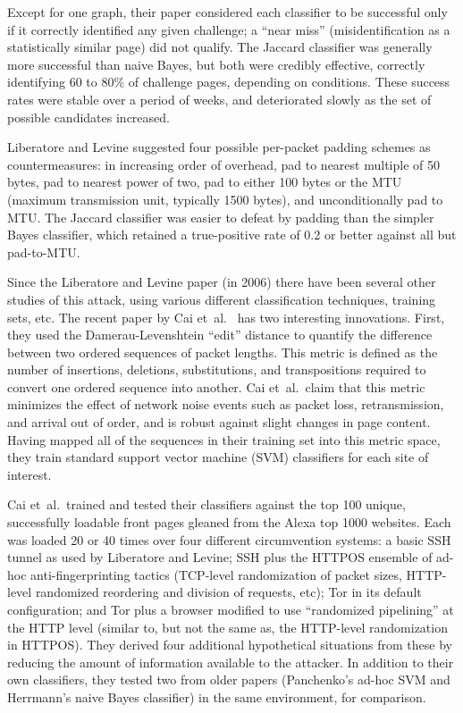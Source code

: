 \documentclass{cmuecequal}
\begin{document}
Except for one graph, their paper considered each classifier to be
successful only if it correctly identified any given challenge; a
“near miss” (misidentification as a statistically similar page) did
not qualify.  The Jaccard classifier was generally more successful
than naive Bayes, but both were credibly effective, correctly
identifying 60 to 80\% of challenge pages, depending on conditions.
These success rates were stable over a period of weeks, and
deteriorated slowly as the set of possible candidates increased.

Liberatore and Levine suggested four possible per-packet padding
schemes as countermeasures: in increasing order of overhead, pad to
nearest multiple of 50 bytes, pad to nearest power of two, pad to
either 100 bytes or the MTU (maximum transmission unit, typically 1500
bytes), and unconditionally pad to MTU.  The Jaccard classifier was
easier to defeat by padding than the simpler Bayes classifier, which
retained a true-positive rate of 0.2 or better against all but
pad-to-MTU.

Since the Liberatore and Levine paper (in 2006) there have been
several other studies of this attack, using various different
classification techniques, training sets, etc.  The recent paper by
Cai et~al.~\cite{Cai:2012} has two interesting innovations.  First,
they used the Damerau-Levenshtein “edit” distance to quantify the
difference between two ordered sequences of packet lengths.  This
metric is defined as the number of insertions, deletions,
substitutions, and transpositions required to convert one ordered
sequence into another.  Cai et~al.~claim that this metric minimizes
the effect of network noise events such as packet loss,
retransmission, and arrival out of order, and is robust against slight
changes in page content.  Having mapped all of the sequences in their
training set into this metric space, they train standard support
vector machine (SVM) classifiers for each site of interest.

Cai et~al.\ trained and tested their classifiers against the top 100
unique, successfully loadable front pages gleaned from the Alexa top
1000 websites.  Each was loaded 20 or 40 times over four different
circumvention systems: a basic SSH tunnel as used by Liberatore and
Levine; SSH plus the HTTPOS ensemble of ad-hoc anti-fingerprinting
tactics (TCP-level randomization of packet sizes, HTTP-level
randomized reordering and division of requests, etc); Tor in its
default configuration; and Tor plus a browser modified to use
“randomized pipelining” at the HTTP level (similar to, but not the
same as, the HTTP-level randomization in HTTPOS).  They derived four
additional hypothetical situations from these by reducing the amount
of information available to the attacker.  In addition to their own
classifiers, they tested two from older papers (Panchenko's ad-hoc SVM
and Herrmann's naive Bayes classifier) in the same environment, for
comparison.
\end{document}
